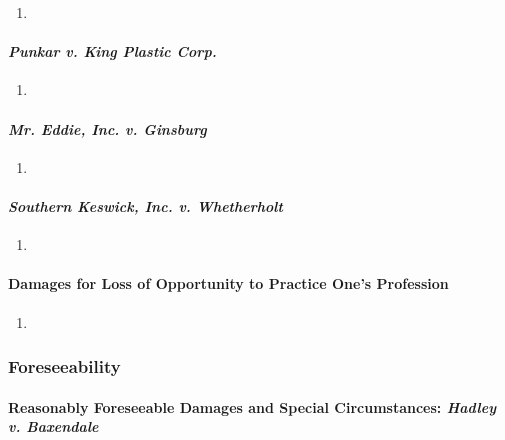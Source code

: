 \begin{enumerate}
    \item %
\end{enumerate}

\paragraph{\emph{Punkar v. King Plastic Corp.}}

\begin{enumerate}
    \item %
\end{enumerate}

\paragraph{\emph{Mr. Eddie, Inc. v. Ginsburg}}

\begin{enumerate}
    \item %
\end{enumerate}

\paragraph{\emph{Southern Keswick, Inc. v. Whetherholt}}

\begin{enumerate}
    \item %
\end{enumerate}

\paragraph{Damages for Loss of Opportunity to Practice One's Profession}

\begin{enumerate}
    \item %
\end{enumerate}

\newpage

\subsubsection{Foreseeability}

\paragraph{Reasonably Foreseeable Damages and Special Circumstances: 
\emph{Hadley v. Baxendale}}

